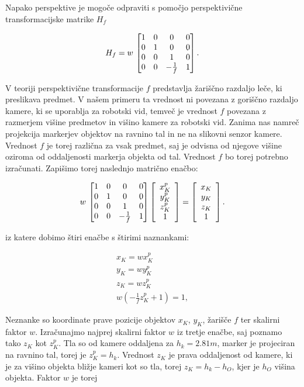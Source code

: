 Napako perspektive je mogoče odpraviti s pomočjo perspektivične transformacijske matrike $H_f$

\begin{equation}
H_f = w \,
\begin{bmatrix}
1 & 0 & 0 & 0 \cr
0 & 1 & 0 & 0 \cr
0 & 0 & 1 & 0 \cr
0 & 0 & -\frac{1}{f} & 1
\end{bmatrix}.
\end{equation}

V teoriji perspektivične transformacije $f$ predstavlja žariščno razdaljo leče, ki preslikava predmet. V našem primeru ta vrednost ni povezana z goriščno razdaljo kamere, ki se uporablja za robotski vid, temveč je vrednost $f$ povezana z razmerjem višine predmetov in višino kamere za robotski vid. Zanima nas namreč projekcija markerjev objektov na ravnino tal in ne na slikovni senzor kamere. Vrednost $f$ je torej različna za vsak predmet, saj je odvisna od njegove višine oziroma od oddaljenosti markerja objekta od tal. Vrednost $f$ bo torej potrebno izračunati. Zapišimo torej naslednjo matrično enačbo:

\begin{equation}
w \,
\begin{bmatrix}
1 & 0 & 0 & 0 \cr
0 & 1 & 0 & 0 \cr
0 & 0 & 1 & 0 \cr
0 & 0 & -\frac{1}{f} & 1
\end{bmatrix}
\left[
\begin{array}{c}
x^p_K \\
y^p_K \\
z^p_K \\
1
\end{array}
\right]
=
\left[
\begin{array}{c}
x_K \\
y_K \\
z_K \\
1
\end{array}
\right].
\end{equation}

iz katere dobimo štiri enačbe s štirimi naznankami:

\begin{eqnarray}
x_K = w x^p_K \\
y_K = w y^p_K \\
z_K = w z^p_K \\
w(-\frac{1}{f}z^p_K+1)=1,
\end{eqnarray}

Neznanke so koordinate prave pozicije objektov $x_K$, $y_K$, žarišče $f$ ter skalirni faktor $w$. Izračunajmo najprej skalirni faktor $w$ iz tretje enačbe, saj poznamo tako $z_K$ kot $z^p_K$. Tla so od kamere oddaljena za $h_k = 2.81m$, marker je projeciran na ravnino tal, torej je $z^p_K = h_k$. Vrednost $z_K$ je prava oddaljenost od kamere, ki je za višino objekta bližje kameri kot so tla, torej $z_K = h_k - h_O$, kjer je $h_O$ višina objekta. Faktor $w$ je torej

